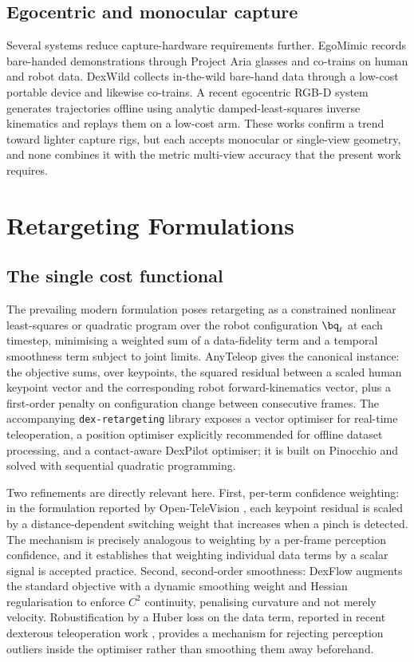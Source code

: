 \subsection{Egocentric and monocular capture}

Several systems reduce capture-hardware requirements further. EgoMimic
\cite{egomimic} records bare-handed demonstrations through Project Aria glasses
and co-trains on human and robot data. DexWild \cite{dexwild} collects
in-the-wild bare-hand data through a low-cost portable device and likewise
co-trains. A recent egocentric RGB-D system \cite{shadowing} generates
trajectories offline using analytic damped-least-squares inverse kinematics and
replays them on a low-cost arm. These works confirm a trend toward lighter
capture rigs, but each accepts monocular or single-view geometry, and none
combines it with the metric multi-view accuracy that the present work requires.

\section{Retargeting Formulations}
\label{sec:lit-retarget}

\subsection{The single cost functional}

The prevailing modern formulation poses retargeting as a constrained nonlinear
least-squares or quadratic program over the robot configuration $\bq_t$ at each
timestep, minimising a weighted sum of a data-fidelity term and a temporal
smoothness term subject to joint limits. AnyTeleop \cite{anyteleop} gives the
canonical instance: the objective sums, over keypoints, the squared residual
between a scaled human keypoint vector and the corresponding robot
forward-kinematics vector, plus a first-order penalty on configuration change
between consecutive frames. The accompanying \texttt{dex-retargeting} library
exposes a vector optimiser for real-time teleoperation, a position optimiser
explicitly recommended for offline dataset processing, and a contact-aware
DexPilot optimiser; it is built on Pinocchio and solved with sequential
quadratic programming.

Two refinements are directly relevant here. First, per-term confidence
weighting: in the formulation reported by Open-TeleVision \cite{opentv}, each
keypoint residual is scaled by a distance-dependent switching weight that
increases when a pinch is detected. The mechanism is precisely analogous to
weighting by a per-frame perception confidence, and it establishes that
weighting individual data terms by a scalar signal is accepted practice.
Second, second-order smoothness: DexFlow \cite{dexflow} augments the standard
objective with a dynamic smoothing weight and Hessian regularisation to enforce
$C^2$ continuity, penalising curvature and not merely velocity. Robustification
by a Huber loss on the data term, reported in recent dexterous teleoperation
work \cite{dexteleop0}, provides a mechanism for rejecting perception outliers
inside the optimiser rather than smoothing them away beforehand.

